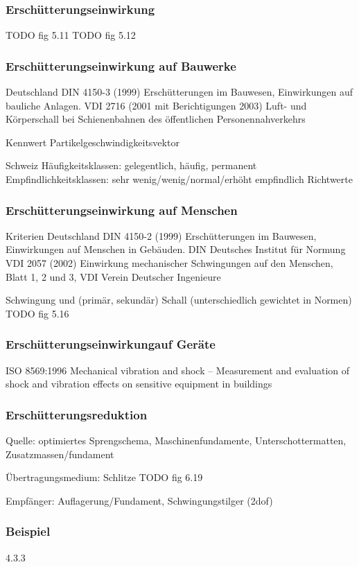 \begin{frame}
\frametitle{Erschütterungseinwirkung}

TODO fig 5.11 \cite{studer2008bodendynamik} %
TODO fig 5.12 \cite{studer2008bodendynamik} %

\end{frame}

\begin{frame}
\frametitle{Erschütterungseinwirkung {\normalsize auf Bauwerke}}
Deutschland DIN 4150-3 (1999) Erschütterungen im Bauwesen, Einwirkungen
auf bauliche Anlagen.
 VDI 2716 (2001 mit Berichtigungen 2003) Luft- und Körperschall
bei Schienenbahnen des öffentlichen Personennahverkehrs

Kennwert Partikelgeschwindigkeitsvektor

Schweiz
Häufigkeitsklassen: gelegentlich, häufig, permanent
Empfindlichkeitsklassen: sehr wenig/wenig/normal/erhöht empfindlich 
Richtwerte
\cite{studer2008bodendynamik}

\end{frame}


\begin{frame}
\frametitle{Erschütterungseinwirkung {\normalsize auf Menschen}}
Kriterien \cite{studer2008bodendynamik}
Deutschland  DIN 4150-2 (1999) Erschütterungen im Bauwesen, Einwirkungen
auf Menschen in Gebäuden. DIN Deutsches Institut für Normung
VDI 2057 (2002) Einwirkung mechanischer Schwingungen auf den
Menschen, Blatt 1, 2 und 3, VDI Verein Deutscher Ingenieure

Schwingung und (primär, sekundär) Schall (unterschiedlich gewichtet in Normen)
TODO fig 5.16 \cite{studer2008bodendynamik}
\end{frame}


\begin{frame}
\frametitle{Erschütterungseinwirkung{\normalsize auf Geräte}}
ISO 8569:1996 Mechanical vibration and shock – Measurement and evaluation of
shock and vibration effects on sensitive equipment in buildings
\cite{studer2008bodendynamik}

\end{frame}


\begin{frame}
\frametitle{Erschütterungsreduktion}
\cite{studer2008bodendynamik}

Quelle: optimiertes Sprengschema, Maschinenfundamente, Unterschottermatten, Zusatzmassen/fundament

Übertragungsmedium: Schlitze TODO fig 6.19

Empfänger: Auflagerung/Fundament, Schwingungstilger (2dof)
\end{frame}


\begin{frame}
\frametitle{Beispiel}
4.3.3 \cite{haupt1986bodendynamik}
\end{frame}


